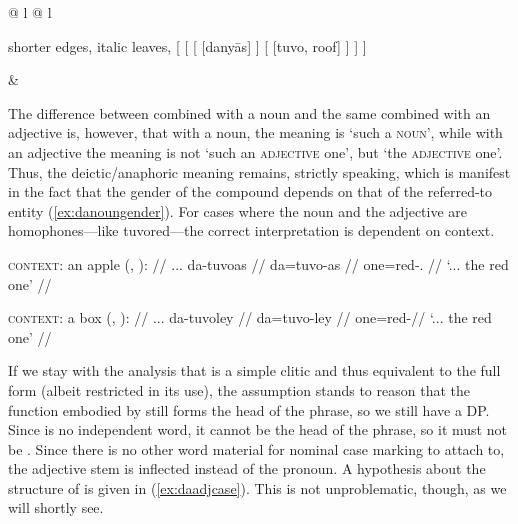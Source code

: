 \ex\label{ex:danyaastuvo} %
\begin{tabular}[t]{@{} l @{\quad} l}
\tl\quad\begin{forest} shorter edges, italic leaves,
[{}
	[\anno{\xbar{D}}
		[\anno{\xhead{D}}
			[danyās]
		]
		[{\anno[\pass{\Adjc}]{AP}}
			[{tuvo}, roof]
		]
	]
]
\end{forest}

&

\tl\quad\label{ex:danyaastuvoavm} 

\end{tabular}
\xe

The difference between  combined with a noun and the same
combined with an adjective is, however, that with a noun, the meaning is `such
a \textsc{noun}', while with an adjective the meaning is not `such an
\textsc{adjective} one', but `the \textsc{adjective} one'. Thus, the
deictic/anaphoric meaning remains, strictly speaking, which is manifest in the
fact that the gender of the compound depends on that of the referred-to entity
(\ref{ex:danoungender}). For cases where the noun and the adjective are
homophones---like  {tuvo}{red}---the correct interpretation is
dependent on context.

\pex\label{ex:danoungender}
\a\begingl
	\glpreamble \textsc{context:} an apple (, \An{}): //
	\gla ... da-tuvoas //
	\glb {} da=tuvo-as //
	\glc {} one=red-\Parg{}.\An{} //
	\glft `... the red one' // 
\endgl

\a\begingl
	\glpreamble \textsc{context:} a box (, \Inan{}): //
	\gla ... da-tuvoley //
	\glb {} da=tuvo-ley //
	\glc {} one=red-\PargI //
	\glft `... the red one' // 
\endgl
\xe

If we stay with the analysis that  is a simple clitic and thus
equivalent to the full form  (albeit restricted in its use),
the assumption stands to reason that the function embodied by 
still forms the head of the phrase, so we still have a DP. Since 
is no independent word, it cannot be the head of the phrase, so it must not be
. Since there is no other word material for nominal case marking to
attach to, the adjective stem is inflected instead of the pronoun. A hypothesis
about the structure of  is given in
(\ref{ex:daadjcase}). This is not unproblematic, though, as we will shortly
see.

